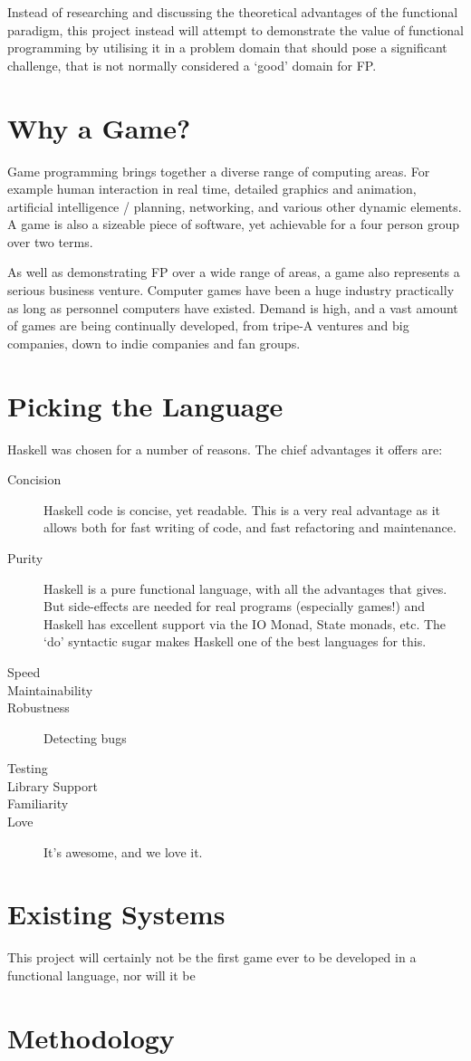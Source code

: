 Instead of researching and discussing the theoretical advantages of the functional paradigm, this project instead will attempt to demonstrate the value of functional programming by utilising it in a problem domain that should pose a significant  challenge, that is not normally considered a `good' domain for FP. 

\section{Why a Game?}

Game programming brings together a diverse range of computing areas. For example human interaction in real time, detailed graphics and animation, artificial intelligence / planning, networking, and various other dynamic elements. A game is also a sizeable piece of software, yet achievable for a four person group over two terms.

As well as demonstrating FP over a wide range of areas, a game also represents a serious business venture. Computer games have been a huge industry practically as long as personnel computers have existed. Demand is high, and a vast amount of games are being continually developed, from tripe-A ventures and big companies, down to indie companies and fan groups. 

\section{Picking the Language}

Haskell was chosen for a number of reasons. The chief advantages it offers are:

\begin{description}
	\item[Concision] Haskell code is concise, yet readable. This is a very real advantage as it allows both for fast writing of code, and fast refactoring and maintenance. 
	\item[Purity] Haskell is a pure functional language, with all the advantages that gives. But side-effects are needed for real programs (especially games!) and Haskell has excellent support via the IO Monad, State monads, etc. The `do' syntactic sugar makes Haskell one of the best languages for this.
	\item[Speed] 
	\item[Maintainability] 
	\item[Robustness] Detecting bugs
	\item[Testing] 
	\item[Library Support] 
	\item[Familiarity] 
	\item[Love] It's awesome, and we love it.
\end{description}

\section{Existing Systems}

This project will certainly not be the first game ever to be developed in a functional language, nor will it be 

\section{Methodology}